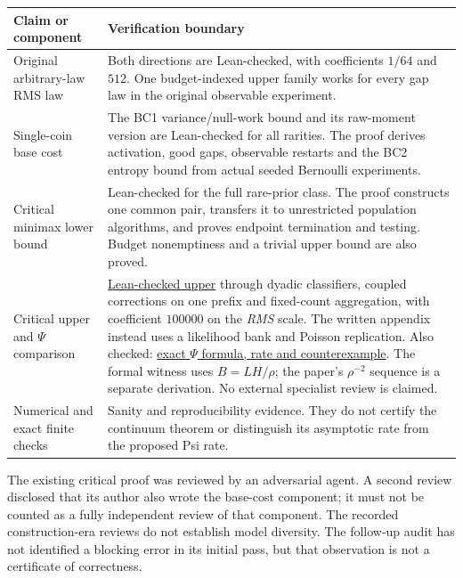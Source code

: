 \begin{center}
\begin{tabular}{>{\raggedright\arraybackslash}p{}>{\raggedright\arraybackslash}p{}}
\toprule
Claim or component & Verification boundary\\
\midrule
Original arbitrary-law RMS law & Both directions are Lean-checked,
with coefficients $1/64$ and $512$. One budget-indexed upper family
works for every gap law in the original observable experiment.\\[5pt]
Single-coin base cost & The BC1 variance/null-work bound and its raw-moment
version are Lean-checked for all rarities. The proof derives activation,
good gaps, observable restarts and the BC2 entropy bound from actual
seeded Bernoulli experiments.\\[5pt]
Critical minimax lower bound & Lean-checked for the full rare-prior class.
The proof constructs one common pair, transfers it to unrestricted
population algorithms, and proves endpoint termination and testing.
Budget nonemptiness and a trivial upper bound are also proved.\\[5pt]
Critical upper and $\Psi$ comparison &
\href{https://github.com/davidiach/adaptive-threshold-estimation/blob/eabf274cb42d4bff4daab6b58568ad6169e7f0a7/lean/ThresholdHC/CriticalUpper/Full.lean}{Lean-checked upper}
through dyadic classifiers, coupled corrections on one prefix and fixed-count
aggregation, with coefficient $100000$ on the \emph{RMS} scale. The written
appendix instead uses a likelihood bank and Poisson replication. Also checked:
\href{https://github.com/davidiach/adaptive-threshold-estimation/blob/eabf274cb42d4bff4daab6b58568ad6169e7f0a7/lean/ThresholdHC/CriticalPsi/Full.lean}{exact $\Psi$ formula, rate and counterexample}.
The formal witness uses $B=LH/\rho$; the paper's $\rho^{-2}$ sequence
is a separate derivation. No external specialist review is claimed.\\[5pt]
Numerical and exact finite checks & Sanity and reproducibility evidence.
They do not certify the continuum theorem or distinguish its asymptotic
rate from the proposed Psi rate.\\
\bottomrule
\end{tabular}
\end{center}

The existing critical proof was reviewed by an adversarial agent. A second
review disclosed that its author also wrote the base-cost component; it
must not be counted as a fully independent review of that component.
The recorded construction-era reviews do not establish model diversity. The follow-up audit has not identified
a blocking error in its initial pass, but that observation is not a
certificate of correctness.

